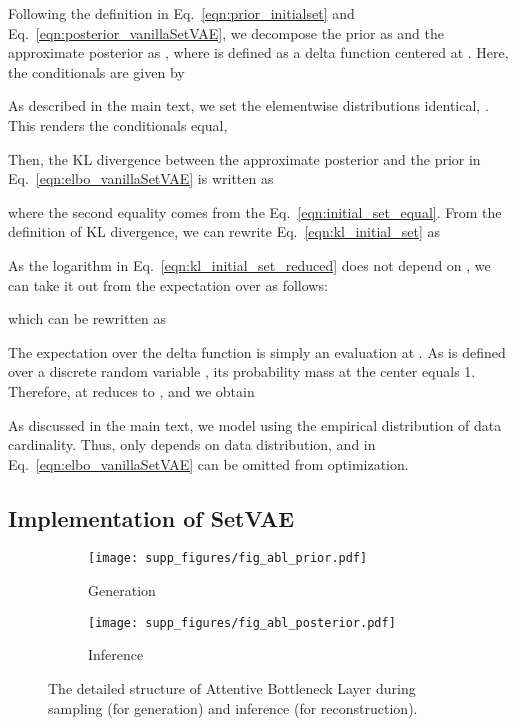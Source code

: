 \documentclass[final]{arxiv/cvpr}
\begin{document}
Following the definition in Eq.~\eqref{eqn:prior_initialset} and Eq.~\eqref{eqn:posterior_vanillaSetVAE}, we decompose the prior as  and the approximate posterior as , where  is defined as a delta function centered at .
Here, the conditionals are given by

As described in the main text, we set the elementwise distributions identical, .
This renders the conditionals equal,

Then, the KL divergence between the approximate posterior and the prior in Eq.~\eqref{eqn:elbo_vanillaSetVAE} is written as

where the second equality comes from the Eq.~\eqref{eqn:initial_set_equal}.
From the definition of KL divergence, we can rewrite Eq.~\eqref{eqn:kl_initial_set} as

As the logarithm in Eq.~\eqref{eqn:kl_initial_set_reduced} does not depend on , we can take it out from the expectation over  as follows:

which can be rewritten as

The expectation over the delta function  is simply an evaluation at .
As  is defined over a discrete random variable , its probability mass at the center  equals 1.
Therefore,  at  reduces to , and we obtain

As discussed in the main text, we model  using the empirical distribution of data cardinality.
Thus,  only depends on data distribution, and  in Eq.~\eqref{eqn:elbo_vanillaSetVAE} can be omitted from optimization.

\subsection{Implementation of SetVAE}
\label{appendix:abl}

\begin{figure}[!t]
    \centering
    \vspace{0.2in}
    \begin{subfigure}[b]{0.395\linewidth}
        \centering
        \texttt{[image: supp\_figures/fig\_abl\_prior.pdf]}
        \caption{Generation}
        \label{fig:abl_prior}
    \end{subfigure}
    \begin{subfigure}[b]{0.59\linewidth}
        \centering
        \texttt{[image: supp\_figures/fig\_abl\_posterior.pdf]}
        \caption{Inference}
        \label{fig:abl_posterior}
    \end{subfigure}
    \caption{The detailed structure of Attentive Bottleneck Layer during sampling (for generation) and inference (for reconstruction).}
\label{fig:abl_structure}
\end{figure}
\end{document}
